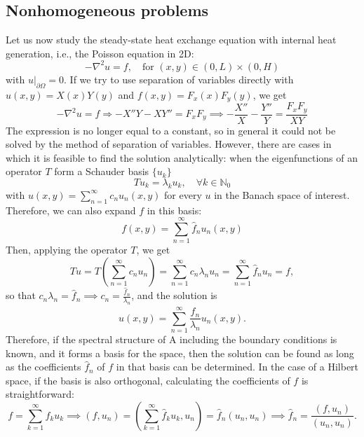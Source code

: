 \subsection{Nonhomogeneous problems}
Let us now study the steady-state heat exchange equation with internal heat generation, i.e., the Poisson equation in 2D:
\begin{equation}\label{eq:poisson-2d}
    -\nabla^{2}u=f, \quad \text{for }(x,y)\in(0,L)\times(0,H)
\end{equation}
with $u|_{\partial\Omega}=0$. If we try to use separation of variables directly with $u(x,y)=X(x)Y(y)$ and $f(x,y)=F_{x}(x)F_{y}(y)$, we get
\begin{equation}
    -\nabla^{2}u=f\Rightarrow-X''Y-XY''=F_{x}F_{y} \implies -\frac{X''}{X}-\frac{Y''}{Y}=\frac{F_{x}F_{y}}{XY}
\end{equation}
The expression is no longer equal to a constant, so in general it could not be solved by the method of separation of variables. However, there are cases in which it is feasible to find the solution analytically: when the eigenfunctions of an operator $T$ form a Schauder basis $\{u_k\}$
\begin{equation}
    T u_{k}=\lambda_{k}u_{k}, \quad \forall k\in\mathbb{N}_0
\end{equation}
with $u(x,y)=\sum_{n=1}^{\infty}c_{n}u_{n}(x,y)$ for every $u$ in the Banach space of interest. Therefore, we can also expand $f$ in this basis:
\begin{equation}
    f(x,y)=\sum_{n=1}^{\infty}\hat{f}_{n}u_{n}(x,y)
\end{equation}
Then, applying the operator $T$, we get
\begin{equation}
    T u = T\left(\sum_{n=1}^{\infty}c_{n}u_{n}\right)=\sum_{n=1}^{\infty}c_{n}\lambda_{n}u_{n}=\sum_{n=1}^{\infty}\hat{f}_{n}u_{n}=f,
\end{equation}
so that $c_{n}\lambda_{n}=\hat{f}_{n} \implies c_{n}=\frac{\hat{f}_{n}}{\lambda_{n}}$, and the solution is
\begin{equation}
    u(x,y)=\sum_{n=1}^{\infty}\frac{\hat{f}_{n}}{\lambda_{n}}u_{n}(x,y).
\end{equation}
Therefore, if the spectral structure of A including the boundary conditions is known, and it forms a basis for the space, then the solution can be found as long as the coefficients $\hat{f}_n$ of $f$ in that basis can be determined. In the case of a Hilbert space, if the basis is also orthogonal, calculating the coefficients of $f$ is straightforward: 
\begin{equation*}
    f=\sum_{k=1}^{\infty}\hat{f}_{k}u_{k}\implies(f,u_{n})=\left(\sum_{k=1}^{\infty}\hat{f}_{k}u_{k},u_{n}\right)=\hat{f}_{n}(u_{n},u_{n}) \implies\hat{f}_{n}=\frac{(f,u_{n})}{(u_{n},u_{n})}.
\end{equation*}

